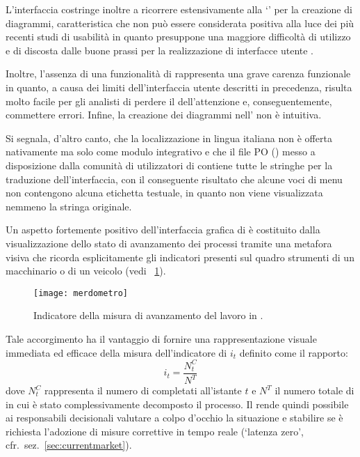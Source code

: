 L'interfaccia  costringe inoltre a ricorrere estensivamente alla  `' per la creazione di diagrammi, caratteristica che non può essere considerata positiva alla luce dei più recenti studi di usabilità in quanto presuppone una maggiore difficoltà di utilizzo e di discosta dalle buone prassi per la realizzazione di interfacce utente \cite{nielsen:mistakes}.

Inoltre, l'assenza di una funzionalità di  rappresenta una grave carenza funzionale in quanto, a causa dei limiti dell'interfaccia utente descritti in precedenza, risulta molto facile per gli analisti di \bsn perdere il  dell'attenzione e, conseguentemente, commettere errori. Infine, la creazione dei diagrammi nell' non è intuitiva.

Si segnala, d'altro canto, che la localizzazione in lingua italiana non è offerta nativamente ma solo come modulo integrativo e che il file PO () messo a disposizione dalla comunità di utilizzatori di \progname contiene tutte le stringhe per la traduzione dell'interfaccia, con il conseguente risultato che alcune voci di menu non contengono alcuna etichetta testuale, in quanto non viene visualizzata nemmeno la stringa originale.

Un aspetto fortemente positivo dell'interfaccia grafica di \progname è costituito dalla visualizzazione dello stato di avanzamento dei processi tramite una metafora visiva che ricorda esplicitamente gli indicatori presenti sul quadro strumenti di un macchinario o di un veicolo (vedi \figurename~\ref{fig:merdometro}).

\begin{figure}[H]
  \centering
  \texttt{[image: merdometro]}
  \caption{Indicatore della misura di avanzamento del lavoro in \progname.}
  \label{fig:merdometro}
\end{figure}

Tale accorgimento ha il vantaggio di fornire una rappresentazione visuale immediata ed efficace della misura dell'indicatore di  $i_{t}$ definito come il rapporto:
\[
i_{t} = \frac{N^{C}_{t}}{N^{T}}
\]
dove $N^{C}_{t}$ rappresenta il numero di  completati all'istante $t$ e $N^{T}$ il numero totale di  in cui è stato complessivamente decomposto il processo. Il \sw rende quindi possibile ai responsabili decisionali valutare a colpo d'occhio la situazione e stabilire se è richiesta l'adozione di misure correttive in tempo reale (`latenza zero', cfr.~sez.~\ref{sec:currentmarket}).

